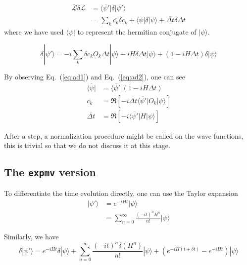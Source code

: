 \documentclass{article}
\theoremstyle{definition}
\newcommand{\Eq}[1]{Eq.~(\ref{#1})}
\begin{document}
\begin{equation}\label{eq:ad1}
    \begin{split}
    \overline{\mathcal{L}}\delta \mathcal{L} &= \overline{\langle\psi'|} \delta |\psi'\rangle\\
    &= \sum_k \overline{c_k} \delta c_k + \overline{\langle\psi|}\delta|\psi\rangle + \overline{\Delta t}\delta \Delta t
    \end{split}
\end{equation}
where we have used $\langle\psi|$ to represent the hermitian conjugate of $|\psi\rangle$.

\begin{equation}\label{eq:ad2}
    \delta|\psi'\rangle = -i\sum_k \delta c_k O_k \Delta t |\psi\rangle - i H \delta \Delta t |\psi\rangle + (1-iH\Delta t) \delta |\psi\rangle
\end{equation}

By observing \Eq{eq:ad1} and \Eq{eq:ad2}, one can see
\begin{align}
    \overline{\langle\psi|} &= \overline{\langle\psi'|}(1-iH\Delta t)\\
    \overline{c_k} &= \Re\left[-i\Delta t\overline{\langle\psi'|} O_k|\psi\rangle\right]\\
    \overline{\Delta t} &= \Re\left[-i\overline{\langle\psi'|} H|\psi\rangle\right]
\end{align}

After a step, a normalization procedure might be called on the wave functions,
this is trivial so that we do not discuss it at this stage.

\subsection{The \texttt{expmv} version}
To differentiate the time evolution directly, one can use the Taylor expansion
\begin{equation}
    \begin{split}
    |\psi'\rangle &= e^{-iHt}|\psi\rangle\\
    & = \sum_{n=0}^{\infty}\frac{(-it)^n H^n}{n!}|\psi\rangle
    \end{split}
\end{equation}

Similarly, we have
\begin{equation}
    \delta|\psi'\rangle = e^{-iHt}\delta|\psi\rangle + \sum_{n=0}^{\infty}\frac{(-it)^n \delta (H^n)}{n!}|\psi\rangle + \left(e^{-iH(t+\delta t)}-e^{-iH t}\right)|\psi\rangle
\end{equation}
\end{document}
